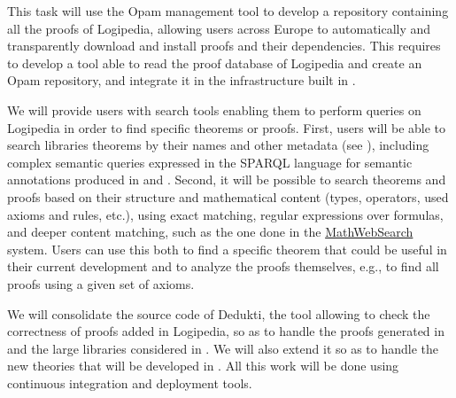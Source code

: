 \begin{workpackage}[id=access,type=RTD,
  short=Access,%
  title={Access},
  lead=Irt,IrtRM=23,OcaRM=6,EduRM=12,InrRM=18]
\begin{tasklist}
\begin{task}[id=opam,
      title=Giving access to the infrastructure in proof tools,
      lead=Oca,
      OcaRM=6]
    This task will use the Opam management tool to develop a
    repository containing all the proofs of Logipedia, allowing users
    across Europe to automatically and transparently download and
    install proofs and their dependencies. This
    requires to develop a tool able to read the proof
    database of Logipedia and create an Opam repository,
    and integrate it in the infrastructure built in .
  \end{task}

  \begin{task}[id=search,
      title=Providing search tools,
      lead=Inr,InrRM=18]
    We will provide users with search tools enabling them to perform
    queries on Logipedia in order to find specific theorems or proofs.
    First, users will be able to search libraries theorems by their
    names and other metadata (see ),
    including complex semantic queries expressed in the SPARQL
    language for semantic annotations produced in
     and
    . Second, it will be possible to
    search theorems and proofs based on their structure and
    mathematical content (types, operators, used axioms and rules,
    etc.), using exact matching, regular expressions over formulas, and
    deeper content matching, such as the one done in the
    \hyperlink{https://kwarc.info/systems/mws/}{MathWebSearch}
    system. Users can use this both to find a specific theorem that
    could be useful in their current development and to analyze the
    proofs themselves, e.g., to find all proofs using a given set of
    axioms. 
  \end{task}

  \begin{task}[id=dedukti,
      title=Development of Dedukti checking and translation tools,
      lead=Inr,InrRM=24]
    We will consolidate the source code of Dedukti, the tool allowing
    to check the correctness of proofs added in Logipedia, so as to
    handle the proofs generated in  and the
    large libraries considered in . We will also
    extend it so as to handle the new theories that will be developed
    in .
    All this work will be done using continuous integration and
    deployment tools.
  \end{task}
  

\end{tasklist}
\end{workpackage}
